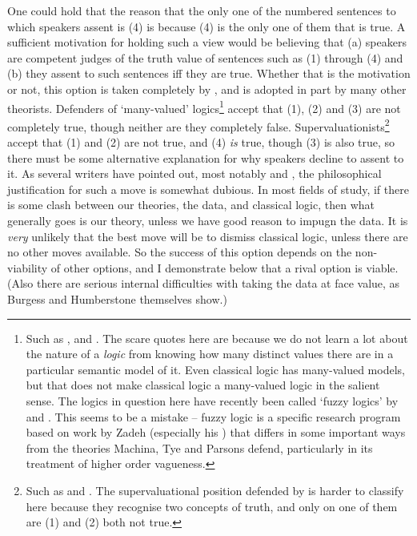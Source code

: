 One could hold that the reason that the only one of the numbered sentences to which speakers assent is (4) is because (4) is the only one of them that is true. A sufficient motivation for holding such a view would be believing that (a) speakers are competent judges of the truth value of sentences such as (1) through (4) and (b) they assent to such sentences iff they are true. Whether that is the motivation or not, this option is taken completely by \citet{Burgess1987}, and is adopted in part by many other theorists. Defenders of `many-valued' logics\footnote{Such as \citet{Machina1976}, \citet{Tye1994} and \citet{Parsons2000}. The scare quotes here are because we do not learn a lot about the nature of a \textit{logic} from knowing how many distinct values there are in a particular semantic model of it. Even classical logic has many-valued models, but that does not make classical logic a many-valued logic in the salient sense. The logics in question here have recently been called `fuzzy logics' by \citet{Bonini1999-BONOTP} and \citet{Priest2001}. This seems to be a mistake -- fuzzy logic is a specific research program based on work by Zadeh (especially his \citeyear{Zadeh1965}) that differs in some important ways from the theories Machina, Tye and Parsons defend, particularly in its treatment of higher order vagueness.} accept that (1), (2) and (3) are not completely true, though neither are they completely false. Supervaluationists\footnote{Such as \citet{Fine1975a} and \citet{Keefe2000}. The supervaluational position defended by \citet{McGee1995} is harder to classify here because they recognise two concepts of truth, and only on one of them are (1) and (2) both not true.} accept that (1) and (2) are not true, and (4) \textit{is }true, though (3) is also true, so there must be some alternative explanation for why speakers decline to assent to it. As several writers have pointed out, most notably \citet{Field1986} and \cite[Ch. 4]{McGee1991}, the philosophical justification for such a move is somewhat dubious. In most fields of study, if there is some clash between our theories, the data, and classical logic, then what generally goes is our theory, unless we have good reason to impugn the data. It is \textit{very} unlikely that the best move will be to dismiss classical logic, unless there are no other moves available. So the success of this option depends on the non-viability of other options, and I demonstrate below that a rival option is viable. (Also there are serious internal difficulties with taking the data at face value, as Burgess and Humberstone themselves show.)

